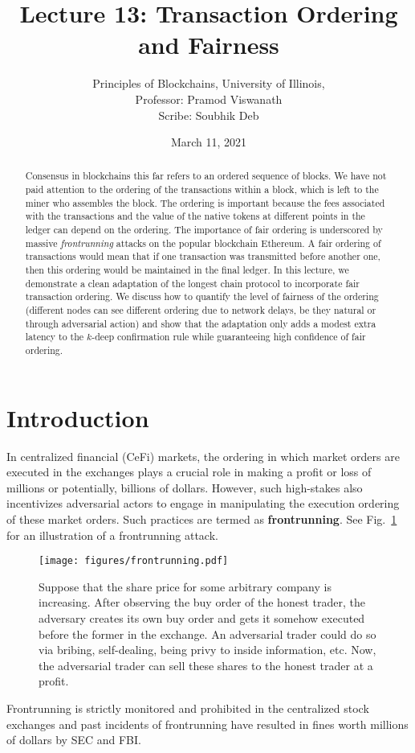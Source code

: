 \documentclass{article}
\title{Lecture 13: Transaction Ordering and Fairness}
\author{Principles of Blockchains, University of Illinois,  \\ Professor:  Pramod Viswanath \\ Scribe:  Soubhik Deb}
\date{March 11, 2021}
\begin{document}
\maketitle

\begin{abstract}
Consensus in blockchains this far refers to an ordered sequence of blocks. We have not paid attention to the  ordering of the transactions within a block, which is left to the miner who assembles the block. The ordering is important because the fees associated with the transactions and the value of the native tokens at different points in the ledger  can depend on the ordering. The importance of fair ordering is  underscored by massive {\em frontrunning} attacks on the popular blockchain {\sf Ethereum}. A fair ordering of transactions would mean that if one transaction was transmitted before another one, then this ordering would be maintained in the final ledger.  In this lecture, we demonstrate a clean adaptation of the longest chain protocol to incorporate  fair transaction ordering. We  discuss how to quantify the level of fairness of the ordering (different nodes can see different ordering due to network delays, be they natural or through adversarial action) and show that the adaptation only adds a modest extra latency to the $k$-deep confirmation rule while guaranteeing high confidence of fair ordering.   
\end{abstract}



\section*{Introduction}
In centralized financial (CeFi) markets, the ordering in which market orders are executed in the exchanges plays a crucial role in making a profit or loss of millions or potentially, billions of dollars. However, such high-stakes also incentivizes adversarial actors to engage in manipulating the execution ordering of these market orders. Such practices are termed as \textbf{frontrunning}. See Fig.~\ref{fig:frontrunning} for an illustration of a frontrunning attack.
\begin{figure}
    \centering
    \texttt{[image: figures/frontrunning.pdf]}
    \caption{Suppose that the share price for some arbitrary company is increasing. After observing the buy order of the honest trader, the adversary creates its own buy order and gets it somehow executed before the former in the exchange. An adversarial trader could do so via bribing, self-dealing, being privy to inside information, etc. Now, the adversarial trader can sell these shares to the honest trader at a profit.}
    \label{fig:frontrunning}
\end{figure}
Frontrunning is strictly monitored and prohibited in the centralized stock exchanges and past incidents of frontrunning have resulted in fines worth millions of dollars by SEC and FBI. 
\end{document}
